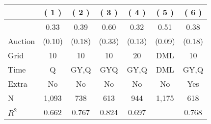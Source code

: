 
\begin{tabular}{lcccccc}
\toprule
 & ( 1 ) & ( 2 ) & ( 3 ) & ( 4 ) & ( 5 ) & ( 6 )\\
\midrule
 & 0.33 & 0.39 & 0.60 & 0.32 & 0.51 & 0.38\\

\multirow{-2}{*}{\raggedright\arraybackslash Auction} & (0.10) & (0.18) & (0.33) & (0.13) & (0.09) & (0.18)\\

\midrule
Grid & 10 & 10 & 10 & 20 & DML & 10\\

Time & Q & GY,Q & GYQ & GY,Q & DML & GY,Q\\

Extra & No & No & No & No & No & Yes\\

N & 1,093 & 738 & 613 & 944 & 1,175 & 618\\

$R^2$ & 0.662 & 0.767 & 0.824 & 0.697 &  & 0.768\\
\bottomrule
\end{tabular}

